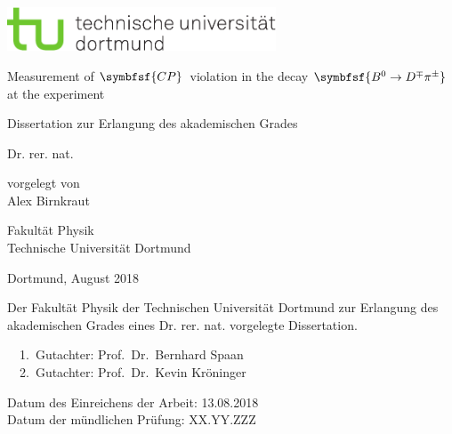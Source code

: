 
\begin{titlepage}
\includegraphics[width=8cm]{tud-logo-cmyk.pdf}
\vspace*{15ex}
{%
\Huge \sffamily \bfseries
\begin{center}
Measurement of $\symbfsf{C{}P}$\, violation in the decay $\symbfsf{\Bz\to D^\mp\pi^\pm}$ at the \lhcb experiment
\end{center}
}%

\begin{otherlanguage}{german}
{%
\LARGE \sffamily %
\begin{center}
Dissertation zur Erlangung des akademischen Grades\\
\end{center}
}

{%
\LARGE \sffamily %
\begin{center}
Dr. rer. nat.
\end{center}
}

\vspace{5ex}


{%
\Large \sffamily
\begin{center}
vorgelegt von \\[0.8ex]
Alex Birnkraut
\end{center}
}
\vspace{5ex}
{%
\Large \sffamily
\begin{center}
Fakultät Physik\\
Technische Universität Dortmund
\end{center}
}
\vspace{4ex}
{%
\Large \sffamily
\begin{center}
Dortmund, August \num{2018}
\end{center}
}

\clearpage
\thispagestyle{empty}
\vspace*{\fill}
\noindent Der Fakultät Physik der Technischen Universität Dortmund zur Erlangung
des akademischen Grades eines Dr. rer. nat. vorgelegte
Dissertation.\\

\parbox{\textwidth}{
  1.~Gutachter: Prof.~Dr.~Bernhard Spaan \\
  2.~Gutachter: Prof.~Dr.~Kevin Kröninger\\
}
\noindent Datum des Einreichens der Arbeit: 13.08.2018\\
\noindent Datum der mündlichen Prüfung: XX.YY.ZZZ
\end{otherlanguage}
\end{titlepage}
\setcounter{page}{1}
